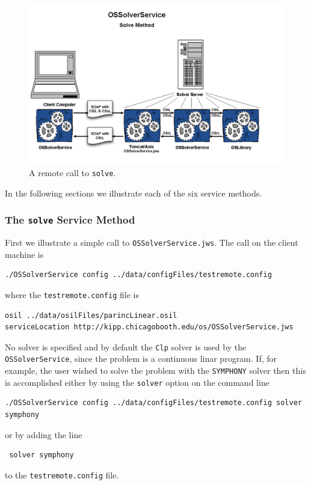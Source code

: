 \begin{figure}
\centering
\includegraphics[scale=0.5]{./figures/Figure10.png}
\caption{A remote call to {\tt solve}.}
\label{figure:ossolverservice}
\end{figure}


In the following sections we illustrate each of the six service methods.

\subsubsection{The  {\tt solve} Service Method}\label{section:solve}

First we illustrate a simple call to  {\tt OSSolverService.jws}.  The call on the client machine is
\begin{verbatim}
./OSSolverService config ../data/configFiles/testremote.config
\end{verbatim}
where the {\tt testremote.config} file is
\begin{verbatim}
osil ../data/osilFiles/parincLinear.osil
serviceLocation http://kipp.chicagobooth.edu/os/OSSolverService.jws
\end{verbatim}

No solver is specified and by default the  {\tt Clp} solver  is used by the {\tt OSSolverService}, 
since the problem is a continuous linar program.
If, for example, the user wished to solve the problem with the 
{\tt SYMPHONY} solver then this is accomplished
either by using the  {\tt solver} option on the command line
\begin{verbatim}
./OSSolverService config ../data/configFiles/testremote.config solver symphony
\end{verbatim}
or by  adding  the line
\begin{verbatim}
 solver symphony
\end{verbatim}
to the  {\tt testremote.config} file.

